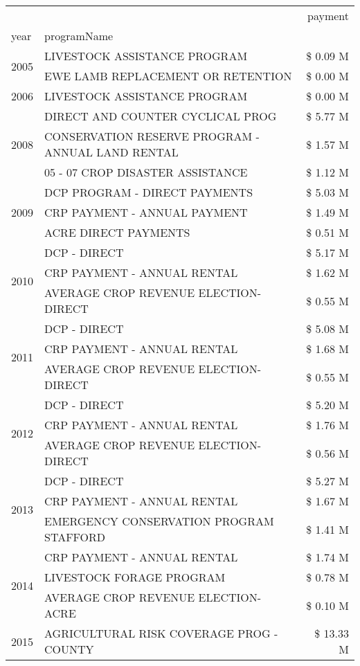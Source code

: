 \begin{tabular}{llr}
\toprule
 &  & payment \\
year & programName &  \\
\midrule
\multirow[t]{2}{*}{2005} & LIVESTOCK ASSISTANCE PROGRAM & \$ 0.09 M \\
 & EWE LAMB REPLACEMENT OR RETENTION & \$ 0.00 M \\
\cline{1-3}
2006 & LIVESTOCK ASSISTANCE PROGRAM & \$ 0.00 M \\
\cline{1-3}
\multirow[t]{3}{*}{2008} & DIRECT AND COUNTER CYCLICAL PROG & \$ 5.77 M \\
 & CONSERVATION RESERVE PROGRAM - ANNUAL LAND RENTAL & \$ 1.57 M \\
 & 05 - 07 CROP DISASTER ASSISTANCE & \$ 1.12 M \\
\cline{1-3}
\multirow[t]{3}{*}{2009} & DCP PROGRAM - DIRECT PAYMENTS & \$ 5.03 M \\
 & CRP PAYMENT - ANNUAL PAYMENT & \$ 1.49 M \\
 & ACRE DIRECT PAYMENTS & \$ 0.51 M \\
\cline{1-3}
\multirow[t]{3}{*}{2010} & DCP - DIRECT & \$ 5.17 M \\
 & CRP PAYMENT - ANNUAL RENTAL & \$ 1.62 M \\
 & AVERAGE CROP REVENUE ELECTION-DIRECT & \$ 0.55 M \\
\cline{1-3}
\multirow[t]{3}{*}{2011} & DCP - DIRECT & \$ 5.08 M \\
 & CRP PAYMENT - ANNUAL RENTAL & \$ 1.68 M \\
 & AVERAGE CROP REVENUE ELECTION-DIRECT & \$ 0.55 M \\
\cline{1-3}
\multirow[t]{3}{*}{2012} & DCP - DIRECT & \$ 5.20 M \\
 & CRP PAYMENT - ANNUAL RENTAL & \$ 1.76 M \\
 & AVERAGE CROP REVENUE ELECTION-DIRECT & \$ 0.56 M \\
\cline{1-3}
\multirow[t]{3}{*}{2013} & DCP - DIRECT & \$ 5.27 M \\
 & CRP PAYMENT - ANNUAL RENTAL & \$ 1.67 M \\
 & EMERGENCY CONSERVATION PROGRAM STAFFORD & \$ 1.41 M \\
\cline{1-3}
\multirow[t]{3}{*}{2014} & CRP PAYMENT - ANNUAL RENTAL & \$ 1.74 M \\
 & LIVESTOCK FORAGE PROGRAM & \$ 0.78 M \\
 & AVERAGE CROP REVENUE ELECTION-ACRE & \$ 0.10 M \\
\cline{1-3}
\multirow[t]{3}{*}{2015} & AGRICULTURAL RISK COVERAGE PROG - COUNTY & \$ 13.33 M \\

\end{tabular}
